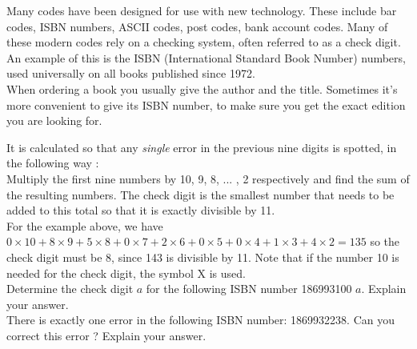 \documentclass[12pt,a4paper]{nsi}
\begin{document}
\pagestyle{empty}
\maketitle

Many codes have been designed for use with new technology. These include bar codes, ISBN numbers, ASCII codes,
post codes, bank account codes. Many of these modern codes rely on a checking system, often referred to as a check
digit.\\

An example of this is the ISBN (International Standard Book Number) numbers, used universally on all books
published since 1972.\\

When ordering a book you usually give the author and the title. Sometimes it's more convenient to give its ISBN number, to make sure you get the exact edition you are looking for.\\

\medskip\par
It is calculated so that any \textit{single} error in the previous nine digits is spotted, in the following way :\\

Multiply the first nine numbers by 10, 9, 8, ... , 2 respectively and find the
sum of the resulting numbers. The check digit is the smallest number that
needs to be added to this total so that it is exactly divisible by 11. \\

For the example above, we have
$0\times 10 + 8 \times 9 + 5 \times 8 +0\times 7 + 2 \times 6 + 0 \times 5 + 0 \times 4 + 1 \times 3 + 4 \times 2 = 135$
so the check digit must be 8, since 143 is divisible by 11.
Note that if the number 10 is needed for the check digit, the symbol X is used.\\

\question Determine the check digit $a$ for the following ISBN number 186993100 $a$. Explain your answer.\\

\question There is exactly one error in the following ISBN number: 1869932238. Can you correct this error ? Explain your answer.\\
\end{document}
